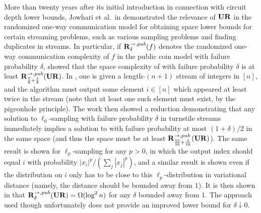 More than twenty years after its initial introduction in connection with circuit depth lower bounds, Jowhari et al.\ in \cite{JowhariST11} demonstrated the relevance of $\mathbf{UR}$ in the randomized one-way communication model for obtaining space lower bounds for certain streaming problems, such as various sampling problems and finding duplicates in streams. In particular, if $\mathbf{R}^{\rightarrow,pub}_\delta(f)$ denotes the randomized one-way communication complexity of $f$ in the public coin model with failure probability $\delta$, \cite{JowhariST11} showed that the space complexity of  with failure probability $\delta$ is at least $\mathbf{R}^{\rightarrow,pub}_{\frac 78 + \frac{\delta}8}(\mathbf{UR})$. In , one is given a length-$(n+1)$ stream of integers in $[n]$, and the algorithm must output some element $i\in[n]$ which appeared at least twice in the stream (note that at least one such element must exist, by the pigeonhole principle). The work \cite{JowhariST11} then showed a reduction demonstrating that any solution to $\ell_0$-sampling with failure probability $\delta$ in turnstile streams immediately implies a solution to  with failure probability at most $(1+\delta)/2$ in the same space (and thus the space must be at least $\mathbf{R}^{\rightarrow,pub}_{\frac{15}{16} + \frac{\delta}{16}}(\mathbf{UR})$). The same result is shown for $\ell_p$-sampling for any $p>0$, in which the output index should equal $i$ with probability $|x_i|^p/(\sum_j |x_j|^p)$, and a similar result is shown even if the distribution on $i$ only has to be close to this $\ell_p$-distribution in variational distance (namely, the distance should be bounded away from $1$). It is then shown in \cite{JowhariST11} that $\mathbf{R}^{\rightarrow,pub}_\delta(\mathbf{UR}) = \Omega(\log^2 n)$ for any $\delta$ bounded away from $1$. The approach used though unfortunately does not provide an improved lower bound for $\delta\downarrow 0$.

